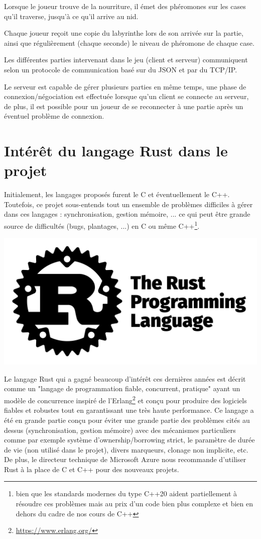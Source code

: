 \documentclass{EPUProjetDi}
\begin{document}
Lorsque le joueur trouve de la nourriture, il émet des phéromones sur les cases qu'il traverse, jusqu'à ce qu'il arrive au nid.

Chaque joueur reçoit une copie du labyrinthe lors de son arrivée sur la partie, ainsi que régulièrement (chaque seconde) le niveau de phéromone de chaque case.

Les différentes parties intervenant dans le jeu (client et serveur) communiquent selon un protocole de communication basé sur du JSON et par du TCP/IP.

Le serveur est capable de gérer plusieurs parties en même temps, une phase de connexion/négociation est effectuée lorsque qu'un client se connecte au serveur, de plus, il est possible pour un joueur de se reconnecter à une partie après un éventuel problème de connexion.

\section{Intérêt du langage Rust dans le projet}

Initialement, les langages proposés furent le C et éventuellement le C++. Toutefois, ce projet sous-entends tout un ensemble de problèmes difficiles à gérer dans ces langages : synchronisation, gestion mémoire, ... ce qui peut être grande source de difficultés (bugs, plantages, ...) en C ou même C++\footnote{bien que les standards modernes du type C++20 aident partiellement à résoudre ces problèmes mais au prix d'un code bien plus complexe et bien en dehors du cadre de nos cours de C++}.

\begin{center}
  \includegraphics[width=\linewidth/2]{rust-social-wide.jpg}
\end{center}

Le langage Rust qui a gagné beaucoup d'intérêt ces dernières années est décrit comme un "langage de programmation fiable, concurrent, pratique" ayant un modèle de concurrence inspiré de l'Erlang\footnote{\url{https://www.erlang.org/}} et conçu pour produire des logiciels fiables et robustes tout en garantissant une très haute performance. Ce langage a été en grande partie conçu pour éviter une grande partie des problèmes cités au dessus (synchronisation, gestion mémoire) avec des mécanismes particuliers comme par exemple système d'ownership/borrowing strict, le paramètre de durée de vie (non utilisé dans le projet), divers marqueurs, clonage non implicite, etc. De plus, le directeur technique de Microsoft Azure nous recommande d'utiliser Rust à la place de C et C++ pour des nouveaux projets\cite{markrussinovich}.
\end{document}
